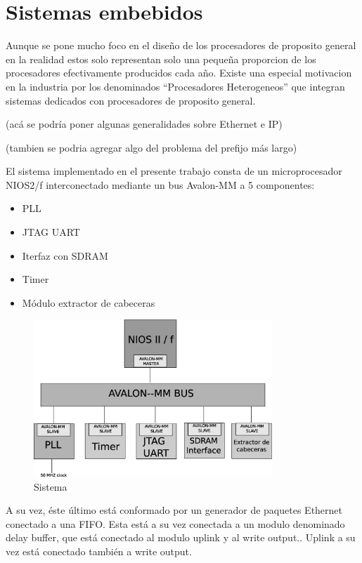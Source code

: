 \section{Sistemas embebidos}
Aunque se pone mucho foco en el  diseño de los procesadores de proposito general en la realidad estos solo representan solo una pequeña proporcion de los procesadores efectivamente producidos cada año.  Existe una especial motivacion en la industria por los denominados “Procesadores Heterogeneos” que integran sistemas dedicados con procesadores de proposito general.

(acá se podría poner algunas generalidades sobre Ethernet e IP)

(tambien se podria agregar algo del problema del prefijo más largo)


El sistema implementado en el presente trabajo consta de un microprocesador NIOS2/f interconectado mediante un bus Avalon-MM a 5 componentes: 
\begin{itemize}
\item PLL
\item JTAG UART
\item Iterfaz con SDRAM
\item Timer
\item Módulo extractor de cabeceras
\end{itemize}


\begin{figure}[h]
  \centering
	\includegraphics[width=0.80\textwidth]{2-sistema/graf/sistema.eps}
  \caption{Sistema}
  \label{fig}
\end{figure}

A su vez, éste último está conformado por un generador de paquetes Ethernet conectado a una FIFO. Esta está a su vez conectada a un modulo denominado delay buffer, que está conectado al modulo uplink y al write output.. Uplink a su vez está conectado también a write output.

